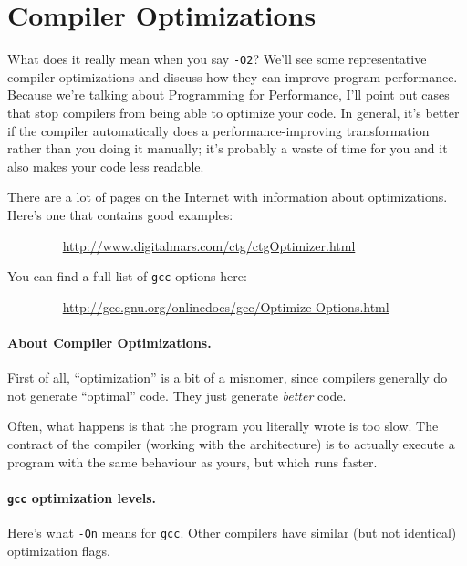 




\section*{Compiler Optimizations}
What does it really mean when you say {\tt -O2}?
We'll see some representative compiler optimizations and discuss how
they can improve program performance. Because we're talking about
Programming for Performance, I'll point out cases that stop compilers
from being able to optimize your code. In general, it's better if the
compiler automatically does a performance-improving transformation
rather than you doing it manually; it's probably a waste of time for
you and it also makes your code less readable.

There are a lot of pages on the Internet with information about
optimizations. Here's one that contains good examples:

$\qquad \qquad$ \url{http://www.digitalmars.com/ctg/ctgOptimizer.html}

You can find a full list of {\tt gcc} options here:

$\qquad \qquad$ \url{http://gcc.gnu.org/onlinedocs/gcc/Optimize-Options.html}

\paragraph{About Compiler Optimizations.} First of all, ``optimization'' is
a bit of a misnomer, since compilers generally do not generate ``optimal'' code.
They just generate \emph{better} code.

Often, what happens is that the program you literally wrote is too slow. The
contract of the compiler (working with the architecture) is to actually execute
a program with the same behaviour as yours, but which runs faster.

\paragraph{{\tt gcc} optimization levels.} Here's what {\tt -On} means for
{\tt gcc}. Other compilers have similar (but not identical) optimization flags.

